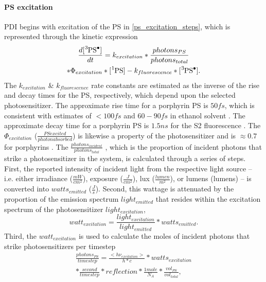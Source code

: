 \paragraph{PS excitation}
PDI begins with excitation of the PS in \cref{ps_excitation_steps}, which is represented through the kinetic expression
\begin{multline} \label{ps_excitation_kinetics}
    \frac{d[\ce{^3PS^.}]}{dt} =  k_{excitation}*\frac{photons_{PS}}{photons_{total}} \\ 
    *\Phi_{excitation}*[\ce{^1PS}] - k_{fluorescence}*[\ce{^3PS^.}]. 
\end{multline}
The $k_{excitation}$ \& $k_{fluorescence}$ rate constants are estimated as the inverse of the rise and decay times for the PS, respectively, which depend upon the selected photosensitizer. The approximate rise time for a porphyrin PS is $50 fs$, which is consistent with estimates of $<100 fs$ \cite{Andersson1999PhotoinducedState} and $60-90 fs$ in ethanol solvent \cite{Gurzadyan1998Time-resolvedZn-tetraphenylporphyrin}. The approximate decay time for a porphyrin PS is $1.5 ns$ for the S2 fluorescence \cite{Akimoto1999UltrafastPorphyrins}. The $\Phi_{excitation}$ ($\frac{PS excited}{photon absorbed}$) is likewise a property of the photosensitizer and is $\approx 0.7$ for porphyrins \cite{Krasnovsky2012PhotochemicalEnvironment}. The $\frac{photons_{incident}}{photons_{total}}$ \cite{Brasel2020AnAgalactiae}, which is the proportion of incident photons that strike a photosensitizer in the system, is calculated through a series of steps. First, the reported intensity of incident light from the respective light source -- i.e. either irradiance ($\frac{mW}{cm^2}$), exposure ($\frac{J}{cm^2}$), lux ($\frac{lumen}{m^2}$), or lumens (lumens) -- is converted into $watts_{emitted}$ ($\frac{J}{s}$). Second, this wattage is attenuated by the proportion of the emission spectrum $light_{emitted}$ that resides within the excitation spectrum of the photosensitizer $light_{excitation}$,
\begin{equation}
    watt_{excitation} = \frac{light_{excitation}}{light_{emitted}}*watts_{emitted}.
\end{equation}
Third, the $watt_{excitation}$ is used to calculate the moles of incident photons that strike photosensitizers per timestep 
\begin{multline} \label{photons_per_second}
    \frac{photons_{PS}}{timestep}=\frac{<h\nu_{excitation}>}{h*c}*watts_{excitation} \\
    *\frac{second}{timestep}*reflection*\frac{1 mole}{N_A}*\frac{vol_{PS}}{vol_{total}},
\end{multline}

